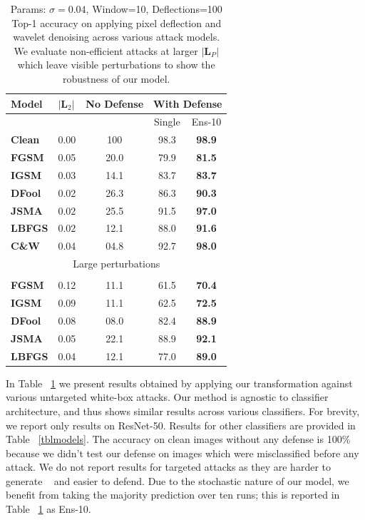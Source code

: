 \begin{table}[H]
\centering
{}
\begin{tabular}{lcccc}
\textbf{Model} & \multicolumn{1}{l}{$|\boldsymbol{L}_2|$} & \multicolumn{1}{l}{\textbf{No Defense}} & \multicolumn{2}{l}{\textbf{With Defense}} \\ \hline
 & \multicolumn{1}{l}{} & \multicolumn{1}{l}{} & Single & Ens-10 \\ \cline{4-5} 
 \textbf{Clean} & 0.00 & 100 & 98.3 & \textbf{98.9} \\ \hline
\textbf{FGSM} & 0.05 & 20.0 & 79.9 & \textbf{81.5} \\
\textbf{IGSM} & 0.03 & 14.1 & 83.7 & \textbf{83.7} \\
\textbf{DFool} & 0.02 & 26.3 & 86.3 & \textbf{90.3} \\
\textbf{JSMA} & 0.02 & 25.5 & 91.5 & \textbf{97.0} \\
\textbf{LBFGS} & 0.02 & 12.1 & 88.0 & \textbf{91.6} \\
\textbf{C\&W} & 0.04 & 04.8 & 92.7 & \textbf{98.0}
\\
 \multicolumn{5}{c}{Large perturbations} \\ \hline
 &&&&\\
\textbf{FGSM} & 0.12 & 11.1 & 61.5 &  \textbf{70.4}\\
\textbf{IGSM} & 0.09 & 11.1 & 62.5 &  \textbf{72.5}\\
\textbf{DFool} & 0.08 & 08.0 & 82.4 &  \textbf{88.9}\\
\textbf{JSMA} & 0.05 & 22.1 & 88.9 &  \textbf{92.1}\\
\textbf{LBFGS} & 0.04 & 12.1 & 77.0 & \textbf{89.0} \\
\end{tabular}
\caption[Classification Accuracy with Pixel Deflection]{ Params: $\sigma=0.04$, Window=10, Deflections=100 \\Top-1 accuracy on applying pixel deflection and wavelet denoising across various attack models. We evaluate non-efficient attacks at larger $|\bm{L}_P|$ which leave visible perturbations to show the robustness of our model.
 \label{tblresults}}
\end{table}
In Table ~\ref{tblresults} we present results obtained by applying our transformation against various untargeted white-box attacks. 
Our method is agnostic to classifier architecture, and thus shows similar results across various classifiers. 
For brevity, we report only results on ResNet-50. 
Results for other classifiers are provided in Table ~\ref{tblmodels}.
The accuracy on clean images without any defense is 100\% because we didn't test our defense on images which were misclassified before any attack.
We do not report results for targeted attacks as they are harder to generate ~\cite{Carlini2017TowardsET} and easier to defend. 
Due to the stochastic nature of our model, we benefit from taking the majority prediction over ten runs; this is reported in Table ~\ref{tblresults} as Ens-10.

